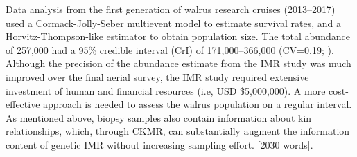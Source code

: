 Data analysis from the first generation of walrus research cruises
(2013–2017) used a Cormack-Jolly-Seber multievent model to estimate
survival rates, and a Horvitz-Thompson-like estimator to obtain population
size. The total abundance of 257,000 had a 95\% credible interval
(CrI) of 171,000–366,000 (CV=0.19; \citealt{beatty_estimating_2022}).
Although the precision of the abundance estimate from the IMR study
was much improved over the final aerial survey, the IMR study required
extensive investment of human and financial resources (i.e, USD \$5,000,000).
A more cost-effective approach is needed to assess the walrus population
on a regular interval. As mentioned above, biopsy samples also contain
information about kin relationships, which, through CKMR, can substantially
augment the information content of genetic IMR without increasing
sampling effort. {[}2030 words{]}.%

